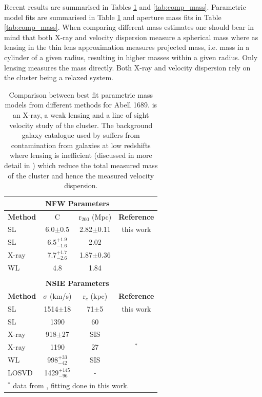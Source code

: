 \documentclass[useAMS,usenatbib]{mn2e}
\newcounter{one}   \setcounter{one}{1}
\begin{document}
Recent results are summarised in Tables \ref{tab:comparison} and
\ref{tab:comp_mass}. Parametric model fits are summarised in Table
\ref{tab:comparison} and aperture mass fits in Table
\ref{tab:comp_mass}. When comparing different mass estimates one
should bear in mind that both \mbox{X-ray} and velocity dispersion
measure a spherical mass where as lensing in the thin lens
approximation measures projected mass, i.e. mass in a cylinder of a
given radius, resulting in higher masses within a given radius. Only
lensing measures the mass directly. Both \mbox{X-ray} and velocity
dispersion rely on the cluster being a relaxed system.\\

\begin{table}
  \centering
  \caption{ Comparison between best fit parametric mass models from
    different methods for Abell 1689. \citet{andersson:04} is an
    \mbox{X-ray}, \citet{king:02} a weak lensing and
    \citet{girardi:97} a line of sight velocity study of the
    cluster. The background galaxy catalogue used by \citet{king:02}
    suffers from contamination from galaxies at low redshifts where
    lensing is inefficient (discussed in more detail in
    \citet{clowe:01}) which reduce the total measured mass of the
    cluster and hence the measured velocity dispersion.}
  \begin{tabular}{lccc}
    &\multicolumn{2}{c}{\bf{NFW Parameters}}&\\
    \hline
    \bf{Method}&C&r$_{200}$ (Mpc)&\bf{Reference}\\
    \hline
    \hline
    SL&6.0$\pm$0.5&2.82$\pm$0.11&this work\\
    \hline
    SL&6.5$^{+1.9}_{-1.6}$& 2.02 &\citealt{broadhurst:05}\\
    \hline
    X-ray&7.7$^{+1.7}_{-2.6}$&1.87$\pm$0.36&\citealt{andersson:04}\\
    \hline
    WL&4.8&1.84&\citealt{king:02}\\
    \hline
    \hline\\
    &\multicolumn{2}{c}{\bf{NSIE Parameters}}&\\
    \hline
    \bf{Method}&$\sigma$ (km/s)&r$_c$ (kpc)&\bf{Reference}\\
    \hline
    \hline
    SL&1514$\pm$18&71$\pm$5&this work\\
    \hline
    SL&1390&60&\citealt{broadhurst:05}\\
    \hline
    X-ray&918$\pm$27&SIS&\citealt{andersson:04}\\
    \hline
    X-ray&1190&27&\citealt{andersson:04}$^*$\\
    \hline
    WL&998$^{+33}_{-42}$&SIS&\citealt{king:02}\\
   \hline
    LOSVD&1429$^{+145}_{-96}$&-&\citealt{girardi:97}\\
   \hline
   \hline
    \multicolumn{4}{l}{$^*$ data from \citealt{andersson:04}, fitting
    done in this work.}\\
  \end{tabular}
  \label{tab:comparison}
\end{table}
\end{document}
